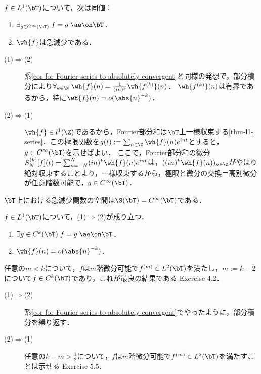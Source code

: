 \documentclass[uplatex,dvipdfmx]{jsreport}
\begin{document}
\begin{theorem}[急減少性による可微分関数の特徴付け]
    $f\in L^1(\bT)$について，次は同値：
    \begin{enumerate}
        \item $\exists_{g\in C^\infty(\bT)}\;f=g\;\ae\on\bT$．
        \item $\wh{f}$は急減少である．
    \end{enumerate}
\end{theorem}
\begin{Proof}\mbox{}
    \begin{description}
        \item[(1)$\Rightarrow$(2)] 系\ref{cor-for-Fourier-series-to-absolutely-convergent}と同様の発想で，部分積分により$\forall_{k\in\N}\;\wh{f}(n)=\frac{1}{(in)^k}\wh{f^{(k)}}(n)$．
        $\wh{f^{(k)}}(n)$は有界であるから，特に$\wh{f}(n)=o(\abs{n}^{-k})$．
        \item[(2)$\Rightarrow$(1)] $\wh{f}\in l^1(\Z)$であるから，Fourier部分和は$\bT$上一様収束する\ref{thm-l1-series}．この極限関数を$g(t):=\sum_{n\in\Z}\wh{f}(n)e^{int}$とすると，$g\in C^\infty(\bT)$を示せばよい．
        ここで，Fourier部分和の微分$S_N^{(k)}[f](t)=\sum_{n=-N}^N(in)^k\wh{f}(n)e^{int}$は，$((in)^k\wh{f}(n))_{n\in\Z}$がやはり絶対収束することより，一様収束するから，極限と微分の交換＝高別微分が任意階数可能で，$g\in C^\infty(\bT)$．
    \end{description}
\end{Proof}
\begin{remarks}
    $\bT$上における急減少関数の空間は$\S(\bT)=C^\infty(\bT)$である．
\end{remarks}

\begin{corollary}
    $f\in L^1(\bT)$について，(1)$\Rightarrow$(2)が成り立つ．
    \begin{enumerate}
        \item $\exists{g\in C^k(\bT)}\;f=g\;\ae\on\bT$．
        \item $\wh{f}(n)=o(\abs{n}^{-k})$．
    \end{enumerate}
    任意の$m<k$について，$f$は$m$階微分可能で$f^{(m)}\in L^2(\bT)$を満たし，$m:=k-2$について$f\in C^{k}(\bT)$であり，これが最良の結果である\cite{Katznelson-Fourier} Exercise 4.2．
\end{corollary}
\begin{Proof}\mbox{}
    \begin{description}
        \item[(1)$\Rightarrow$(2)] 系\ref{cor-for-Fourier-series-to-absolutely-convergent}でやったように，部分積分を繰り返す．
        \item[(2)$\Rightarrow$(1)] 任意の$k-m>\frac{1}{2}$について，$f$は$m$階微分可能で$f^{(m)}\in L^2(\bT)$を満たすことは示せる\cite{Katznelson-Fourier} Exercise 5.5． 
    \end{description}
\end{Proof}
\end{document}
